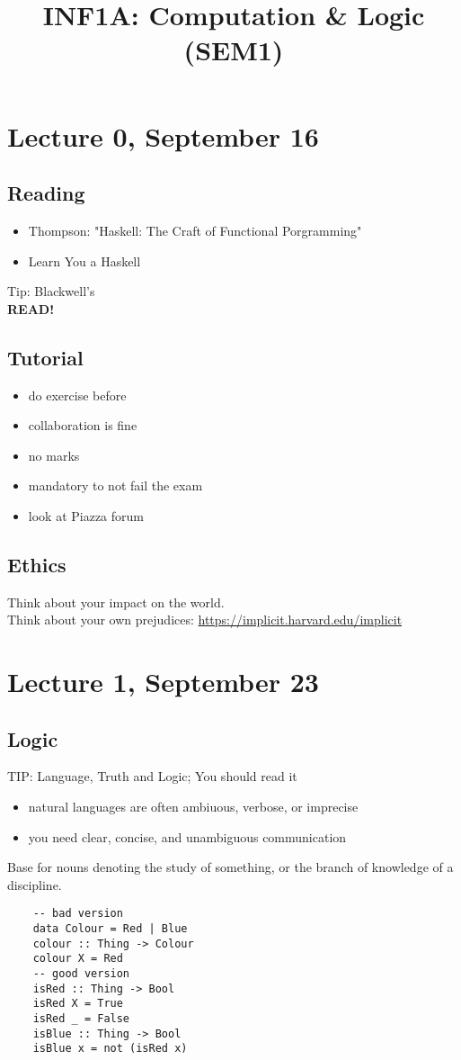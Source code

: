 \documentclass{article}
\begin{document}
\title{INF1A: Computation \& Logic (SEM1)}
\tableofcontents
\pagebreak
\section{Lecture 0, September 16}
\subsection{Reading}
\begin{itemize}
	\item Thompson: "Haskell: The Craft of Functional Porgramming"
	\item Learn You a Haskell
\end{itemize}
Tip: Blackwell's\\
\textbf{READ!}
\subsection{Tutorial}
\begin{itemize}
	\item do exercise before
	\item collaboration is fine
	\item no marks
	\item mandatory to not fail the exam
\end{itemize}
\begin{itemize}
	\item look at Piazza forum
\end{itemize}
\subsection{Ethics}
Think about your impact on the world.\\
Think about your own prejudices:
\url{https://implicit.harvard.edu/implicit}
\section{Lecture 1, September 23}
\subsection{Logic}
TIP: Language, Truth and Logic; You should read it
\begin{itemize}
	\item natural languages are often ambiuous, verbose, or imprecise
	\item you need clear, concise, and unambiguous communication
\end{itemize}
Base for nouns denoting the study of something, or the branch of knowledge of a discipline.
\begin{verbatim}
    -- bad version
    data Colour = Red | Blue
    colour :: Thing -> Colour
    colour X = Red
    -- good version
    isRed :: Thing -> Bool
    isRed X = True
    isRed _ = False
    isBlue :: Thing -> Bool
    isBlue x = not (isRed x)
\end{verbatim}
\end{document}
